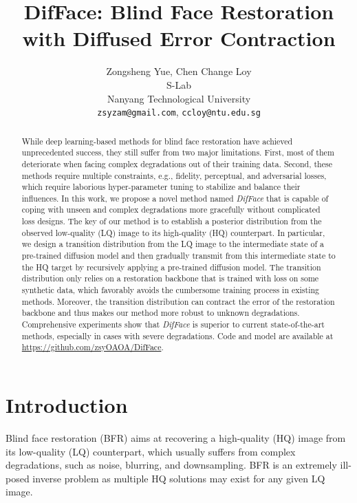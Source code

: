 \documentclass[10pt,twocolumn,letterpaper]{article}
\begin{document}
\title{DifFace: Blind Face Restoration with Diffused Error Contraction}


\author{Zongsheng Yue, Chen Change Loy\\
S-Lab \\
Nanyang Technological University\\
{\tt\small zsyzam@gmail.com},
{\tt\small ccloy@ntu.edu.sg}
}

\maketitle
\ificcvfinal\thispagestyle{empty}\fi

\begin{abstract}
    While deep learning-based methods for blind face restoration have achieved unprecedented success, they still suffer from two major limitations. First, most of them deteriorate when facing complex degradations out of their training data. Second, these methods require multiple constraints, e.g., fidelity, perceptual, and adversarial losses, which require laborious hyper-parameter tuning to stabilize and balance their influences. In this work, we propose a novel method named \textit{DifFace} that is capable of coping with unseen and complex degradations more gracefully without complicated loss designs. The key of our method is to establish a posterior distribution from the observed low-quality (LQ) image to its high-quality (HQ) counterpart. In particular, we design a transition distribution from the LQ image to the intermediate state of a pre-trained diffusion model and then gradually transmit from this intermediate state to the HQ target by recursively applying a pre-trained diffusion model. The transition distribution only relies on a restoration backbone that is trained with  loss on some synthetic data, which favorably avoids the cumbersome training process in existing methods. Moreover, the transition distribution can contract the error of the restoration backbone and thus makes our method more robust to unknown degradations. Comprehensive experiments show that \textit{DifFace} is superior to current state-of-the-art methods, especially in cases with severe degradations. Code and model are available at \url{https://github.com/zsyOAOA/DifFace}.
\end{abstract}

\section{Introduction}
Blind face restoration (BFR) aims at recovering a high-quality (HQ) image from its low-quality (LQ) counterpart, which usually suffers from complex degradations, such as noise, blurring, and downsampling. BFR is an extremely ill-posed inverse problem as multiple HQ solutions may exist for any given LQ image.
\end{document}
